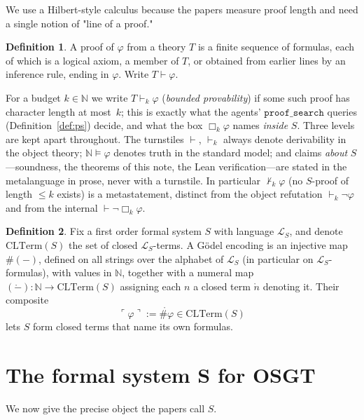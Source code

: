 \documentclass[11pt]{article}
\theoremstyle{definition}
\newtheorem{definition}{Definition}[section]
\theoremstyle{plain}
\theoremstyle{remark}
\newcommand{\NN}{\mathbb{N}}
\newcommand{\bx}[1]{\Box_{#1}}
\newcommand{\ps}{\texttt{proof\_search}}
\begin{document}
We use a Hilbert-style calculus because the papers measure proof length and need a single notion of "line of a proof."



\begin{definition}\label{def:hilbert}
A proof of $\varphi$ from a theory $T$
is a finite sequence of formulas, each of which is a logical axiom, a member of $T$, or
obtained from earlier lines by an inference rule,
ending in $\varphi$. Write $T\vdash\varphi$.
\end{definition}

For a budget $k\in\NN$ we write $T\vdash_k\varphi$ (\emph{bounded provability}) if some such proof has character length at most~$k$; this is exactly what the agents' $\ps$ queries (Definition~\ref{def:ps}) decide, and what the box $\bx{k}\varphi$ names \emph{inside} $S$. Three levels are kept apart throughout. The turnstiles $\vdash$, $\vdash_k$ always denote derivability in the object theory; $\NN\models\varphi$ denotes truth in the standard model; and claims \emph{about} $S$---soundness, the theorems of this note, the Lean verification---are stated in the metalanguage in prose, never with a turnstile. In particular $\nvdash_k\varphi$ (no $S$-proof of length $\le k$ exists) is a metastatement, distinct from the object refutation $\vdash_k\neg\varphi$ and from the internal $\vdash\neg\bx{k}\varphi$.

\begin{definition}\label{def:godel}
Fix a first order formal system $S$ with language $\mathcal{L}_S$, and denote $\mathrm{CLTerm}(S)$ the set of closed $\mathcal{L}_S$-terms.
A G\"odel encoding is an injective map $\#(-)$, defined on all strings over the alphabet of
$\mathcal{L}_S$ (in particular on $\mathcal{L}_S$-formulas), with values in $\mathbb{N}$,
together with a numeral map $(\mathring{-})\colon\mathbb{N}\to\mathrm{CLTerm}(S)$ assigning
each $n$ a closed term $\mathring{n}$ denoting it. Their composite
\[
\ulcorner\varphi\urcorner := \mathring{\#\varphi}\in\mathrm{CLTerm}(S)
\]
lets $S$ form closed terms that name its own formulas.
\end{definition}


\newpage

\section{The formal system S for OSGT}

We now give the precise object the papers call $S$.
\end{document}
